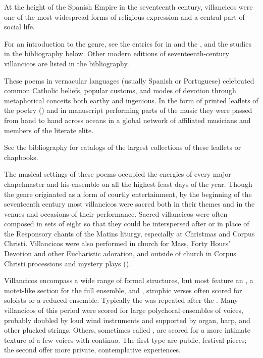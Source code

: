 
At the height of the Spanish Empire in the seventeenth century,
villancicos were one of the most widespread forms of religious expression and a 
central part of social life.%
  \begin{Footnote}
      For an introduction to the genre, see the entries for  in 
       and the , and the studies in the bibliography below.
      Other modern editions of seventeenth-century villancicos are listed in the 
      bibliography.
  \end{Footnote}
These poems in vernacular languages (usually Spanish or Portuguese) celebrated 
common Catholic beliefs, popular customs, and modes of devotion through 
metaphorical conceits both earthy and ingenious.
In the form of printed leaflets of the poetry () and in 
manuscript performing parts of the music they were passed from hand to hand 
across oceans in a global network of affiliated musicians and members of the 
literate elite.%
  \begin{Footnote}
      See the bibliography for catalogs of the largest collections of these 
      leaflets or chapbooks.
  \end{Footnote}

The musical settings of these poems occupied the energies of every major 
chapelmaster and his ensemble on all the highest feast days of the year.
Though the genre originated as a form of courtly entertainment, by the 
beginning of the seventeenth century most villancicos were sacred both in their 
themes and in the venues and occasions of their performance.
Sacred villancicos were often composed in sets of eight so that they could be 
interspersed after or in place of the Responsory chants of the Matins liturgy, 
especially at Christmas and Corpus Christi.
Villancicos were also performed in church for Mass, Forty Hours' Devotion and 
other Eucharistic adoration, and outside of church in Corpus Christi 
processions and mystery plays ().

Villancicos encompass a wide range of formal structures, but most feature an 
, a motet-like section for the full ensemble, and 
, strophic verses often scored for soloists or a reduced ensemble.
Typically the  was repeated after the .
Many villancicos of this period were scored for large polychoral ensembles of 
voices, probably doubled by loud wind instruments and supported by organ, harp, 
and other plucked strings.
Others, sometimes called , are scored for a more intimate 
texture of a few voices with continuo.
The first type are public, festival pieces; the second offer more private, 
contemplative experiences.


